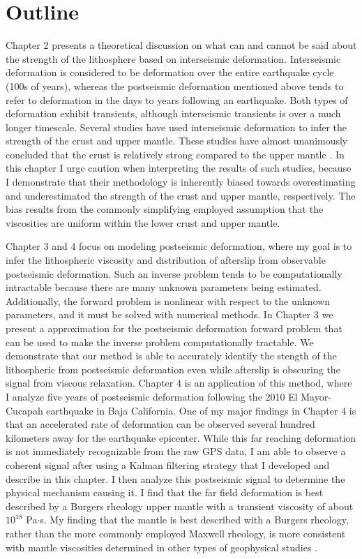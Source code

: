 \section{Outline}
Chapter 2 presents a theoretical discussion on what can and cannot be
said about the strength of the lithosphere based on interseismic
deformation. Interseismic deformation is considered to be deformation
over the entire earthquake cycle (100s of years), whereas the
postseismic deformation mentioned above tends to refer to deformation
in the days to years following an earthquake. Both types of
deformation exhibit transients, although interseismic transients is
over a much longer timescale. Several studies have used interseismic
deformation to infer the strength of the crust and upper mantle. These
studies have almost unanimously concluded that the crust is relatively
strong compared to the upper mantle \citep{Thatcher2008}. In this
chapter I urge caution when interpreting the results of such studies,
because I demonstrate that their methodology is inherently biased
towards overestimating and underestimated the strength of the crust
and upper mantle, respectively. The bias results from the commonly
simplifying employed assumption that the viscosities are uniform
within the lower crust and upper mantle.

Chapter 3 and 4 focus on modeling postseismic deformation, where my
goal is to infer the lithospheric viscosity and distribution of
afterslip from observable postseismic deformation. Such an inverse
problem tends to be computationally intractable because there are many
unknown parameters being estimated. Additionally, the forward problem
is nonlinear with respect to the unknown parameters, and it must be
solved with numerical methods. In Chapter 3 we present a approximation
for the postseismic deformation forward problem that can be used to
make the inverse problem computationally tractable. We demonstrate
that our method is able to accurately identify the stength of the
lithospheric from postseismic deformation even while afterslip is
obscuring the signal from viscous relaxation. Chapter 4 is an
application of this method, where I analyze five years of postseismic
deformation following the 2010 El Mayor-Cucapah earthquake in Baja
California. One of my major findings in Chapter 4 is that an
accelerated rate of deformation can be observed several hundred
kilometers away for the earthquake epicenter. While this far reaching
deformation is not immediately recognizable from the raw GPS data, I
am able to observe a coherent signal after using a Kalman filtering
strategy that I developed and describe in this chapter. I then analyze
this postseismic signal to determine the physical mechanism causing
it. I find that the far field deformation is best described by a
Burgers rheology upper mantle with a transient viscosity of about
$10^{18}$ Pa$\cdot$s. My finding that the mantle is best described
with a Burgers rheology, rather than the more commonly employed
Maxwell rheology, is more consistent with mantle viscosities
determined in other types of geophysical studies
\citep[e.g.,][]{Crittenden1967,Bills1987}.

